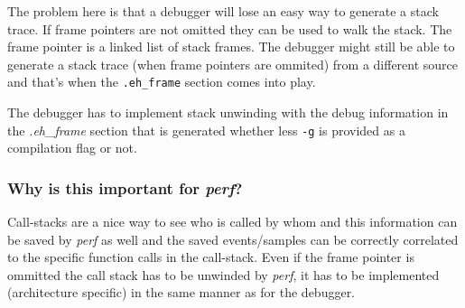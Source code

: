 The problem here is that a debugger will lose an easy way to generate
a stack trace. If frame pointers are not omitted they can be used to
walk the stack. The frame pointer is a linked list of stack frames.
The debugger might still be able to generate a stack trace (when frame
pointers are ommited) from a different source and that's when the
{\tt .eh_frame} section comes into play.

The debugger has to implement stack unwinding with the debug
information in the {\em .eh_frame} section that is generated whether less
{\tt -g} is provided as a compilation flag or not.


\subsubsection{Why is this important for {\em perf}?}

Call-stacks are a nice way to see who is called by whom and this
information can be saved by {\em perf} as well and the saved
events/samples can be correctly correlated to the specific function
calls in the call-stack. Even if the frame pointer is ommitted the
call stack has to be unwinded by {\em perf}, it has to be implemented
(architecture specific) in the same manner as for the debugger.
